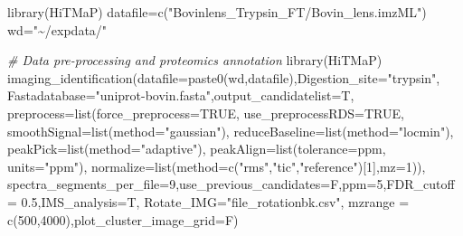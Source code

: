 \documentclass[
]{article}
\newenvironment{Shaded}{\begin{snugshade}}{\end{snugshade}}
\newcommand{\AttributeTok}[1]{\textcolor[rgb]{0.77,0.63,0.00}{#1}}
\newcommand{\CommentTok}[1]{\textcolor[rgb]{0.56,0.35,0.01}{\textit{#1}}}
\newcommand{\ConstantTok}[1]{\textcolor[rgb]{0.00,0.00,0.00}{#1}}
\newcommand{\DecValTok}[1]{\textcolor[rgb]{0.00,0.00,0.81}{#1}}
\newcommand{\FloatTok}[1]{\textcolor[rgb]{0.00,0.00,0.81}{#1}}
\newcommand{\FunctionTok}[1]{\textcolor[rgb]{0.00,0.00,0.00}{#1}}
\newcommand{\NormalTok}[1]{#1}
\newcommand{\OtherTok}[1]{\textcolor[rgb]{0.56,0.35,0.01}{#1}}
\newcommand{\StringTok}[1]{\textcolor[rgb]{0.31,0.60,0.02}{#1}}
\begin{document}
\begin{Shaded}
\begin{Highlighting}[]
\FunctionTok{library}\NormalTok{(HiTMaP)}
\NormalTok{datafile}\OtherTok{=}\FunctionTok{c}\NormalTok{(}\StringTok{"Bovinlens\_Trypsin\_FT/Bovin\_lens.imzML"}\NormalTok{)}
\NormalTok{wd}\OtherTok{=}\StringTok{"\textasciitilde{}/expdata/"}

\CommentTok{\# Data pre{-}processing and proteomics annotation}
\FunctionTok{library}\NormalTok{(HiTMaP)}
\FunctionTok{imaging\_identification}\NormalTok{(}\AttributeTok{datafile=}\FunctionTok{paste0}\NormalTok{(wd,datafile),}\AttributeTok{Digestion\_site=}\StringTok{"trypsin"}\NormalTok{,}
                       \AttributeTok{Fastadatabase=}\StringTok{"uniprot{-}bovin.fasta"}\NormalTok{,}\AttributeTok{output\_candidatelist=}\NormalTok{T,}
                       \AttributeTok{preprocess=}\FunctionTok{list}\NormalTok{(}\AttributeTok{force\_preprocess=}\ConstantTok{TRUE}\NormalTok{,}
                               \AttributeTok{use\_preprocessRDS=}\ConstantTok{TRUE}\NormalTok{,}
                               \AttributeTok{smoothSignal=}\FunctionTok{list}\NormalTok{(}\AttributeTok{method=}\StringTok{"gaussian"}\NormalTok{),}
                               \AttributeTok{reduceBaseline=}\FunctionTok{list}\NormalTok{(}\AttributeTok{method=}\StringTok{"locmin"}\NormalTok{),}
                               \AttributeTok{peakPick=}\FunctionTok{list}\NormalTok{(}\AttributeTok{method=}\StringTok{"adaptive"}\NormalTok{),}
                               \AttributeTok{peakAlign=}\FunctionTok{list}\NormalTok{(}\AttributeTok{tolerance=}\NormalTok{ppm, }\AttributeTok{units=}\StringTok{"ppm"}\NormalTok{),}
                               \AttributeTok{normalize=}\FunctionTok{list}\NormalTok{(}\AttributeTok{method=}\FunctionTok{c}\NormalTok{(}\StringTok{"rms"}\NormalTok{,}\StringTok{"tic"}\NormalTok{,}\StringTok{"reference"}\NormalTok{)[}\DecValTok{1}\NormalTok{],}\AttributeTok{mz=}\DecValTok{1}\NormalTok{)),}
                       \AttributeTok{spectra\_segments\_per\_file=}\DecValTok{9}\NormalTok{,}\AttributeTok{use\_previous\_candidates=}\NormalTok{F,}\AttributeTok{ppm=}\DecValTok{5}\NormalTok{,}\AttributeTok{FDR\_cutoff =} \FloatTok{0.5}\NormalTok{,}\AttributeTok{IMS\_analysis=}\NormalTok{T,}
                       \AttributeTok{Rotate\_IMG=}\StringTok{"file\_rotationbk.csv"}\NormalTok{,}
                       \AttributeTok{mzrange =} \FunctionTok{c}\NormalTok{(}\DecValTok{500}\NormalTok{,}\DecValTok{4000}\NormalTok{),}\AttributeTok{plot\_cluster\_image\_grid=}\NormalTok{F)}


\end{Highlighting}
\end{Shaded}
\end{document}
